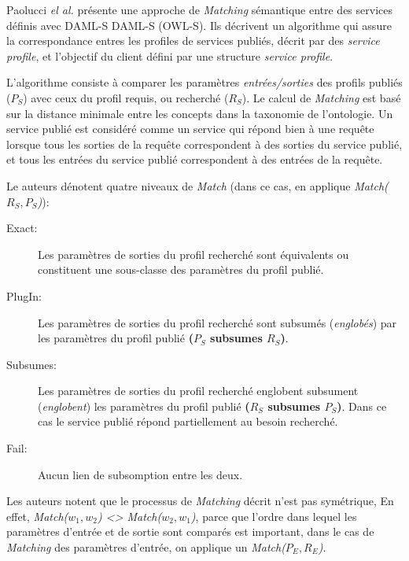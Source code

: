     Paolucci \emph{el al.} \cite{paolucci2002semantic} présente une
    approche de \textit{Matching} sémantique entre des services
    définis avec \textsc{DAML-S} \textsc{DAML-S} (\textsc{OWL-S}). Ils
    décrivent un algorithme qui assure la correspondance entres les
    profiles de services publiés, décrit par des \textit{service
      profile}, et l'objectif du client défini par une structure
    \textit{service profile}.\medskip

    L'algorithme consiste à comparer les paramètres
    \textit{entrées/sorties} des profils publiés ($P_S$) avec ceux du
    profil requis, ou recherché ($R_S$). Le calcul de
    \textit{Matching} est basé sur la distance minimale entre les
    concepts dans la taxonomie de l'ontologie. Un service publié est
    considéré comme un service qui répond bien à une requête lorsque
    tous les sorties de la requête correspondent à des sorties du
    service publié, et tous les entrées du service publié
    correspondent à des entrées de la requête.\medskip

    Le auteurs dénotent quatre niveaux de \textit{Match} (dans ce cas,
    en applique \textit{Match($R_S, P_S$)}):

    \renewcommand{\descriptionlabel}[1]{\hspace{1cm}--~\textsf{#1}}
    \begin{description}
    \item [Exact:] Les paramètres de sorties du profil recherché sont
      équivalents ou constituent une sous-classe des paramètres du
      profil publié.

    \item [PlugIn:] Les paramètres de sorties du profil recherché sont
      subsumés (\textit{englobés}) par les paramètres du profil publié
      \textbf{($P_S$ subsumes $R_S$)}.

    \item [Subsumes:] Les paramètres de sorties du profil recherché
      englobent subsument (\textit{englobent}) les paramètres du
      profil publié \textbf{($R_S$ subsumes $P_S$)}. Dans ce cas le
      service publié répond partiellement au besoin recherché.

    \item [Fail:] Aucun lien de subsomption entre les deux.
    \end{description}
    \enddescription

    Les auteurs notent que le processus de \textit{Matching} décrit
    n'est pas symétrique, En effet, \textit{Match($w_1, w_2$) <>
      Match($w_2, w_1$)}, parce que l'ordre dans lequel les paramètres
    d'entrée et de sortie sont comparés est important, dans le cas de
    \textit{Matching} des paramètres d'entrée, on applique un
    \textit{Match($P_E, R_E$)}.\bigskip


